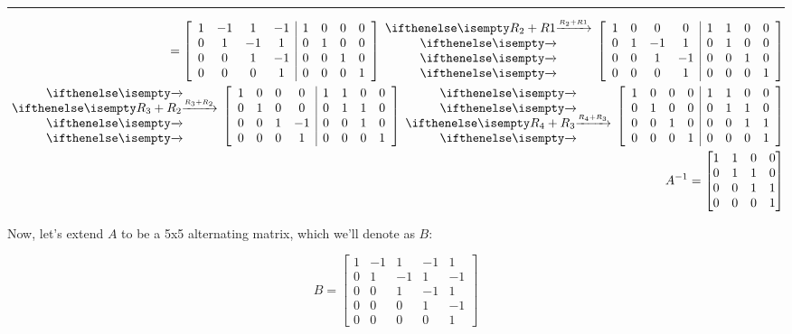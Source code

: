 \documentclass[
  letterpaper,
  DIV=11,
  numbers=noendperiod]{scrartcl}
\begin{document}
\centering \textcolor[RGB]{0,0,0}{\rule{\linewidth}{0.6pt}}

\begin{align*}
[A \ \ I] = \left[\begin{array}{cccc|cccc}
1 & -1 & 1 & -1 & 1 & 0 & 0 & 0 \\
0 & 1 & -1 & 1 & 0 & 1 & 0 & 0 \\
0 & 0 & 1 & -1 & 0 & 0 & 1 & 0 \\
0 & 0 & 0 & 1 & 0 & 0 & 0 & 1
\end{array}\right] \rowops{R_2+R1,,,} \left[\begin{array}{cccc|cccc}
1 & 0 & 0 & 0 & 1 & 1 & 0 & 0 \\
0 & 1 & -1 & 1 & 0 & 1 & 0 & 0 \\
0 & 0 & 1 & -1 & 0 & 0 & 1 & 0 \\
0 & 0 & 0 & 1 & 0 & 0 & 0 & 1
\end{array}\right] &\\
\rowops{,R_3+R_2,,} \left[\begin{array}{cccc|cccc}
1 & 0 & 0 & 0 & 1 & 1 & 0 & 0 \\
0 & 1 & 0 & 0 & 0 & 1 & 1 & 0 \\
0 & 0 & 1 & -1 & 0 & 0 & 1 & 0 \\
0 & 0 & 0 & 1 & 0 & 0 & 0 & 1
\end{array}\right] \rowops{,,R_4+R_3,} \left[\begin{array}{cccc|cccc}
1 & 0 & 0 & 0 & 1 & 1 & 0 & 0 \\
0 & 1 & 0 & 0 & 0 & 1 & 1 & 0 \\
0 & 0 & 1 & 0 & 0 & 0 & 1 & 1 \\
0 & 0 & 0 & 1 & 0 & 0 & 0 & 1
\end{array}\right] &\\
A^{-1} = \begin{bmatrix}
1 & 1 & 0 & 0 \\
0 & 1 & 1 & 0 \\
0 & 0 & 1 & 1 \\
0 & 0 & 0 & 1
\end{bmatrix} &\\
\end{align*}

Now, let's extend \(A\) to be a 5x5 alternating matrix, which we'll
denote as \(B\):

\[
B = \begin{bmatrix}
1 & -1 & 1 & -1 & 1 \\
0 & 1 & -1 & 1 & -1 \\
0 & 0 & 1 & -1 & 1 \\
0 & 0 & 0 & 1 & -1 \\
0 & 0 & 0 & 0 & 1
\end{bmatrix}
\]
\end{document}
